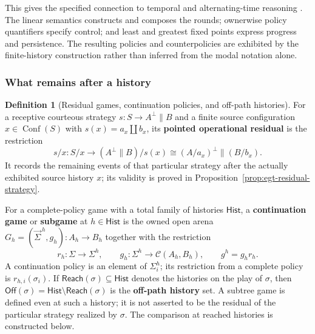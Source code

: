 \documentclass[11pt,a4paper]{article}
\numberwithin{equation}{section}
\theoremstyle{definition}
\newtheorem{definition}[theorem]{Definition}
\theoremstyle{remark}
\theoremstyle{plain}
\begin{document}
This gives the specified connection to temporal and alternating-time
reasoning \citep{AlurEtAl2002}. The linear semantics constructs and
composes the rounds; ownerwise policy quantifiers specify control;
and least and greatest fixed points express progress and persistence.
The resulting policies and counterpolicies are exhibited by the
finite-history construction rather than inferred from the modal
notation alone.

\subsubsection{What remains after a history}

\begin{definition}[Residual games, continuation policies, and off-path histories]
\label{def:egt-residual-game}
For a receptive courteous strategy
$s:S\to A^\perp\parallel B$ and a finite source configuration
$x\in\operatorname{Conf}(S)$ with $s(x)=a_x\amalg b_x$, its
\textbf{pointed operational residual} is the restriction
\[
 s/x:S/x\longrightarrow(A^\perp\parallel B)/s(x)
 \cong (A/a_x)^\perp\parallel(B/b_x).
\]
It records the remaining events of that particular strategy after the
actually exhibited source history $x$; its validity is proved in
Proposition~\ref{prop:egt-residual-strategy}.

For a complete-policy game with a total family of histories
$\mathsf{Hist}$, a \textbf{continuation game} or \textbf{subgame} at
$h\in\mathsf{Hist}$ is the owned open arena
$G_h=(\vec\Sigma^{\,h},g_h):A_h\to B_h$ together with the restriction
\[
 r_h:\Sigma\to\Sigma^h,\qquad
 g_h:\Sigma^h\to\mathcal C(A_h,B_h),\qquad
 g^h=g_hr_h.
\]
A continuation policy is an element of $\Sigma_i^h$; its restriction
from a complete policy is $r_{h,i}(\sigma_i)$. If
$\mathsf{Reach}(\sigma)\subseteq\mathsf{Hist}$ denotes the histories
on the play of $\sigma$, then
$\mathsf{Off}(\sigma)=\mathsf{Hist}\setminus\mathsf{Reach}(\sigma)$
is the \textbf{off-path history} set. A subtree game is defined even at
such a history; it is not asserted to be the residual of the particular
strategy realized by $\sigma$. The comparison at reached histories is
constructed below.
\end{definition}
\end{document}
